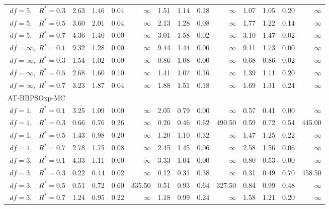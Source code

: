 \documentclass[12pt]{article}
\begin{document}
\begin{table}[ht]
{\begin{tabular}{r|rrrr|rrrr|rrrr}
  $df = 5,\enspace$ $R^* =0.3$ & 2.63 & 1.46 & 0.04 & $\infty$ & 1.51 & 1.14 & 0.18 & $\infty$ & 1.07 & 1.05 & 0.20 & $\infty$ \\ 
  $df = 5,\enspace$ $R^* =0.5$ & 3.60 & 2.01 & 0.04 & $\infty$ & 2.13 & 1.28 & 0.08 & $\infty$ & 1.77 & 1.22 & 0.14 & $\infty$ \\ 
  $df = 5,\enspace$ $R^* =0.7$ & 4.36 & 1.40 & 0.00 & $\infty$ & 3.01 & 1.58 & 0.02 & $\infty$ & 3.10 & 1.47 & 0.02 & $\infty$ \\ 
  $df = \infty,$ $R^* =0.1$ & 9.32 & 1.28 & 0.00 & $\infty$ & 9.44 & 1.44 & 0.00 & $\infty$ & 9.11 & 1.73 & 0.00 & $\infty$ \\ 
  $df = \infty,$ $R^* =0.3$ & 1.54 & 1.02 & 0.00 & $\infty$ & 0.86 & 1.08 & 0.00 & $\infty$ & 0.68 & 0.86 & 0.02 & $\infty$ \\ 
  $df = \infty,$ $R^* =0.5$ & 2.68 & 1.60 & 0.10 & $\infty$ & 1.41 & 1.07 & 0.16 & $\infty$ & 1.39 & 1.11 & 0.20 & $\infty$ \\ 
  $df = \infty,$ $R^* =0.7$ & 3.23 & 1.87 & 0.04 & $\infty$ & 1.88 & 1.51 & 0.18 & $\infty$ & 1.69 & 1.31 & 0.24 & $\infty$ \\ 
\hline
\multicolumn{1}{l|}{AT-BBPSOxp-MC} &&&&&&&&&&&&\\
  $df = 1,\enspace$ $R^* =0.1$ & 3.25 & 1.09 & 0.00 & $\infty$ & 2.05 & 0.79 & 0.00 & $\infty$ & 0.57 & 0.41 & 0.00 & $\infty$ \\ 
  $df = 1,\enspace$ $R^* =0.3$ & 0.66 & 0.76 & 0.26 & $\infty$ & 0.26 & 0.46 & 0.62 & 490.50 & 0.59 & 0.72 & 0.54 & 445.00 \\ 
  $df = 1,\enspace$ $R^* =0.5$ & 1.43 & 0.98 & 0.20 & $\infty$ & 1.20 & 1.10 & 0.32 & $\infty$ & 1.47 & 1.25 & 0.22 & $\infty$ \\ 
  $df = 1,\enspace$ $R^* =0.7$ & 2.78 & 1.75 & 0.08 & $\infty$ & 2.45 & 1.45 & 0.06 & $\infty$ & 2.58 & 1.56 & 0.06 & $\infty$ \\ 
  $df = 3,\enspace$ $R^* =0.1$ & 4.33 & 1.11 & 0.00 & $\infty$ & 3.33 & 1.04 & 0.00 & $\infty$ & 0.80 & 0.53 & 0.00 & $\infty$ \\ 
  $df = 3,\enspace$ $R^* =0.3$ & 0.22 & 0.44 & 0.02 & $\infty$ & 0.12 & 0.31 & 0.38 & $\infty$ & 0.31 & 0.49 & 0.70 & 458.50 \\ 
  $df = 3,\enspace$ $R^* =0.5$ & 0.51 & 0.72 & 0.60 & 335.50 & 0.51 & 0.93 & 0.64 & 327.50 & 0.84 & 0.99 & 0.48 & $\infty$ \\ 
  $df = 3,\enspace$ $R^* =0.7$ & 1.24 & 0.95 & 0.22 & $\infty$ & 1.18 & 0.99 & 0.24 & $\infty$ & 1.58 & 1.21 & 0.20 & $\infty$ \\ 

\end{tabular}}
\end{table}
\end{document}
